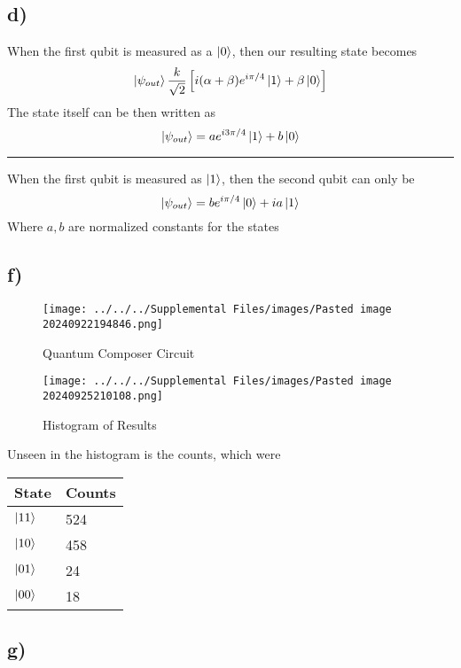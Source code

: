 \documentclass[]{article}
\begin{document}
\hypertarget{d}{%
\subsection{d)}\label{d}}

When the first qubit is measured as a \(\ket{0}\), then our resulting
state becomes \[
\ket{\psi_{out}} \frac{k}{\sqrt{ 2 }}\left[  i(\alpha+\beta) e^{ i\pi/4 }\ket{1}+\beta \ket{0}  \right] 
\] The state itself can be then written as \[
\ket{\psi_{out}} = ae^{ i 3\pi/4 }\ket{1} +b\ket{0} 
\]

\begin{center}\rule{0.5\linewidth}{0.5pt}\end{center}

When the first qubit is measured as \(\ket{1}\), then the second qubit
can only be \[
\ket{\psi_{out}} = be^{ i\pi/4 }\ket{0} +ia\ket{1} 
\] Where \(a,b\) are normalized constants for the states

\hypertarget{f}{%
\subsection{f)}\label{f}}

\begin{figure}
\centering
\texttt{[image: ../../../Supplemental Files/images/Pasted image 20240922194846.png]}
\caption{Quantum Composer Circuit}
\end{figure}

\begin{figure}
\centering
\texttt{[image: ../../../Supplemental Files/images/Pasted image 20240925210108.png]}
\caption{Histogram of Results}
\end{figure}

Unseen in the histogram is the counts, which were

\begin{longtable}[]{@{}ll@{}}
\toprule\noalign{}
State & Counts \\
\midrule\noalign{}
\endhead
\bottomrule\noalign{}
\endlastfoot
\(\ket{11}\) & 524 \\
\(\ket{10}\) & 458 \\
\(\ket{01}\) & 24 \\
\(\ket{00}\) & 18 \\
\end{longtable}

\hypertarget{g}{%
\subsection{g)}\label{g}}
\end{document}
